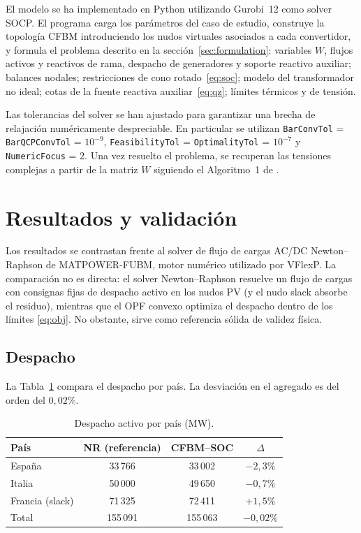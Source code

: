 \documentclass[12pt,a4paper]{iit-project-draft-report}
\begin{document}
El modelo se ha implementado en Python utilizando Gurobi~12 como solver
\gls{SOCP}. El programa carga los parámetros del caso de estudio,
construye la topología \gls{CFBM} introduciendo los nudos virtuales
asociados a cada convertidor, y formula el problema descrito en la
sección~\ref{sec:formulation}: variables $W$, flujos activos y reactivos
de rama, despacho de generadores y soporte reactivo auxiliar; balances
nodales; restricciones de cono rotado~\eqref{eq:soc}; modelo del
transformador no ideal; cotas de la fuente reactiva auxiliar~\eqref{eq:qz};
límites térmicos y de tensión.

Las tolerancias del solver se han ajustado para garantizar una brecha de
relajación numéricamente despreciable. En particular se utilizan
{\tt BarConvTol} = {\tt BarQCPConvTol} = $10^{-9}$,
{\tt FeasibilityTol} = {\tt OptimalityTol} = $10^{-7}$ y
{\tt NumericFocus} = 2. Una vez resuelto el problema, se recuperan las
tensiones complejas a partir de la matriz $W$ siguiendo el Algoritmo~1
de \cite{HigueraGutierrez2025}.

\section{Resultados y validación}
\label{sec:results}

Los resultados se contrastan frente al solver de flujo de cargas AC/DC
Newton--Raphson de \gls{MATPOWER}-\gls{FUBM}, motor numérico utilizado
por \gls{VFlexP}. La comparación no es directa: el solver Newton--Raphson
resuelve un flujo de cargas con consignas fijas de despacho activo en los
nudos PV (y el nudo slack absorbe el residuo), mientras que el \gls{OPF}
convexo optimiza el despacho dentro de los límites \eqref{eq:obj}. No
obstante, sirve como referencia sólida de validez física.

\subsection{Despacho}

La Tabla~\ref{tab:dispatch} compara el despacho por país. La desviación
en el agregado es del orden del $0{,}02\%$.

\begin{table}[h]
\centering
\caption{Despacho activo por país (MW).}
\label{tab:dispatch}
\begin{tabular}{lccc}
\toprule
País & NR (referencia) & CFBM--SOC & $\Delta$ \\
\midrule
España & 33\,766 & 33\,002 & $-2{,}3\%$ \\
Italia & 50\,000 & 49\,650 & $-0{,}7\%$ \\
Francia (slack) & 71\,325 & 72\,411 & $+1{,}5\%$ \\
\midrule
Total & 155\,091 & 155\,063 & $-0{,}02\%$ \\
\bottomrule
\end{tabular}
\end{table}
\end{document}
